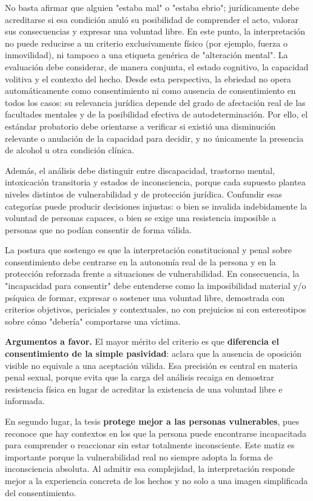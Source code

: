 \documentclass[
	spanish,
	letterpaper, oneside
]{article}
\begin{document}
No basta afirmar que alguien "estaba mal" o "estaba ebrio"; jurídicamente debe acreditarse si esa condición anuló su posibilidad de comprender el acto, valorar sus consecuencias y expresar una voluntad libre. En este punto, la interpretación no puede reducirse a un criterio exclusivamente físico (por ejemplo, fuerza o inmovilidad), ni tampoco a una etiqueta genérica de "alteración mental". La evaluación debe considerar, de manera conjunta, el estado cognitivo, la capacidad volitiva y el contexto del hecho. Desde esta perspectiva, la ebriedad no opera automáticamente como consentimiento ni como ausencia de consentimiento en todos los casos: su relevancia jurídica depende del grado de afectación real de las facultades mentales y de la posibilidad efectiva de autodeterminación. Por ello, el estándar probatorio debe orientarse a verificar si existió una disminución relevante o anulación de la capacidad para decidir, y no únicamente la presencia de alcohol u otra condición clínica.

Además, el análisis debe distinguir entre discapacidad, trastorno mental, intoxicación transitoria y estados de inconsciencia, porque cada supuesto plantea niveles distintos de vulnerabilidad y de protección jurídica. Confundir esas categorías puede producir decisiones injustas: o bien se invalida indebidamente la voluntad de personas capaces, o bien se exige una resistencia imposible a personas que no podían consentir de forma válida.

La postura que sostengo es que la interpretación constitucional y penal sobre consentimiento debe centrarse en la autonomía real de la persona y en la protección reforzada frente a situaciones de vulnerabilidad. En consecuencia, la "incapacidad para consentir" debe entenderse como la imposibilidad material y/o psíquica de formar, expresar o sostener una voluntad libre, demostrada con criterios objetivos, periciales y contextuales, no con prejuicios ni con estereotipos sobre cómo "debería" comportarse una víctima.

\textbf{Argumentos a favor.} El mayor mérito del criterio es que \textbf{diferencia el consentimiento de la simple pasividad}: aclara que la ausencia de oposición visible no equivale a una aceptación válida. Esa precisión es central en materia penal sexual, porque evita que la carga del análisis recaiga en demostrar resistencia física en lugar de acreditar la existencia de una voluntad libre e informada.

En segundo lugar, la tesis \textbf{protege mejor a las personas vulnerables}, pues reconoce que hay contextos en los que la persona puede encontrarse incapacitada para comprender o reaccionar sin estar totalmente inconsciente. Este matiz es importante porque la vulnerabilidad real no siempre adopta la forma de inconsciencia absoluta. Al admitir esa complejidad, la interpretación responde mejor a la experiencia concreta de los hechos y no solo a una imagen simplificada del consentimiento.
\end{document}
